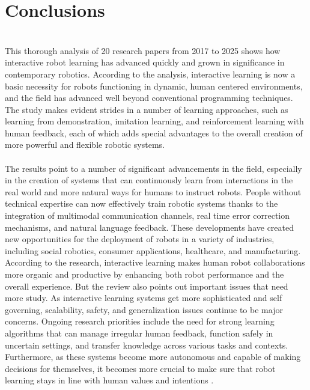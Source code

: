 \documentclass[report.tex]{subfiles}
\begin{document}
    \chapter{Conclusions}\\

    This thorough analysis of 20 research papers from 2017 to 2025 shows how interactive robot learning has advanced quickly and grown in significance in contemporary robotics. According to the analysis, interactive learning is now a basic necessity for robots functioning in dynamic, human centered environments, and the field has advanced well beyond conventional programming techniques. The study makes evident strides in a number of learning approaches, such as learning from demonstration, imitation learning, and reinforcement learning with human feedback, each of which adds special advantages to the overall creation of more powerful and flexible robotic systems.\\\\
The results point to a number of significant advancements in the field, especially in the creation of systems that can continuously learn from interactions in the real world and more natural ways for humans to instruct robots. People without technical expertise can now effectively train robotic systems thanks to the integration of multimodal communication channels, real time error correction mechanisms, and natural language feedback. These developments have created new opportunities for the deployment of robots in a variety of industries, including social robotics, consumer applications, healthcare, and manufacturing. According to the research, interactive learning makes human robot collaborations more organic and productive by enhancing both robot performance and the overall experience.
But the review also points out important issues that need more study. As interactive learning systems get more sophisticated and self governing, scalability, safety, and generalization issues continue to be major concerns. Ongoing research priorities include the need for strong learning algorithms that can manage irregular human feedback, function safely in uncertain settings, and transfer knowledge across various tasks and contexts. Furthermore, as these systems become more autonomous and capable of making decisions for themselves, it becomes more crucial to make sure that robot learning stays in line with human values and intentions .\\\\
\end{document}
